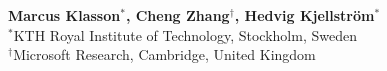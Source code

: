




\chapter{
}\label{chap:paperA}
\begin{comment}
\vspace{-1cm}
\large{\textbf{Marcus Klasson}} \\
\large{\textit{Robotics, Perception, and Learning, EECS}} \\
\large{\textit{KTH Royal Institute of Technology, Stockholm, Sweden}} \\

\noindent\large{\textbf{Cheng Zhang}} \\
\large{\textit{Microsoft Research}} \\
\large{\textit{Cambridge, United Kingdom}} \\

\noindent\large{\textbf{Hedvig Kjellstr\"{o}m}} \\
\large{\textit{Robotics, Perception, and Learning, EECS}} \\
\large{\textit{KTH Royal Institute of Technology, Stockholm, Sweden}} 
\end{comment}
\vspace{-5mm}
\begin{center}
\large{\textbf{Marcus Klasson$^{*}$, Cheng Zhang$^{\dagger}$, Hedvig Kjellström$^{*}$}} \\[2mm]
\small{$^{*}$KTH Royal Institute of Technology, Stockholm, Sweden} \\
\small{$^{\dagger}$Microsoft Research, Cambridge, United Kingdom} \\
\end{center}


